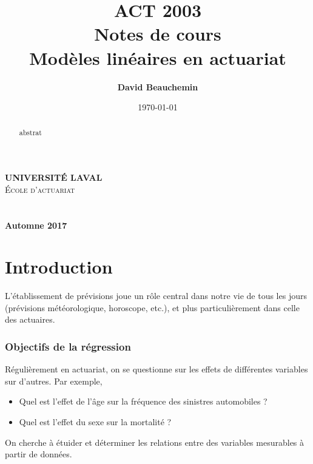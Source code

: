 \documentclass[11pt,french]{report}
\title{ACT 2003 \\ Notes de cours \\ Modèles linéaires en actuariat}
\author{\textbf{David Beauchemin}}
\date{\today}
\def\versionnumber{Automne 2017}
\begin{document}


\makeatletter
  \begin{titlepage}
  \centering
      {\large \textbf{\textsc{UNIVERSITÉ LAVAL}}}\\
      \textsc{École d'actuariat}\\
    \vspace{2cm}
    \vspace{2cm}
      {\LARGE \textbf{\@title}} \\
    \vfill
       {\large \@author} \\
    \vspace{8cm}
        {\large\textbf{\versionnumber}}\\
    \vfill
  \end{titlepage}
\makeatother


\pagebreak

\tableofcontents

\newpage


\begin{abstract}
\begin{itshape}
abstrat
\end{itshape}
\end{abstract}


\chapter{Introduction}
L'établissement de prévisions joue un rôle central dans notre vie de tous les jours (prévisions météorologique, horoscope, etc.), et plus particulièrement dans celle des actuaires.

\subsection*{Objectifs de la régression}
Régulièrement en actuariat, on se questionne sur les effets de différentes variables sur d'autres. Par exemple,
\begin{itemize}
\item Quel est l'effet de l'âge sur la fréquence des sinistres automobiles ?
\item Quel est l'effet du sexe sur la mortalité ?
\end{itemize}

On cherche à étuider et déterminer les relations entre des variables mesurables à partir de données.
\end{document}
